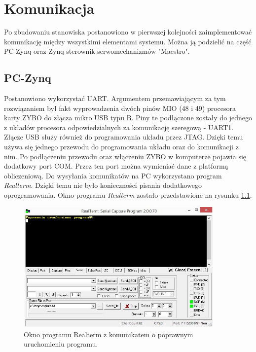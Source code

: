 \chapter{Komunikacja}
\label{cha:komunikacja}

Po zbudowaniu stanowiska postanowiono w pierwszej kolejności zaimplementować komunikację między wszystkimi elementami systemu. 
Można ją podzielić na część PC-Zynq oraz Zynq-sterownik serwomechanizmów "Maestro".

\section{PC-Zynq}
\label{sec:pc-zynq}
Postanowiono wykorzystać UART. 
Argumentem przemawiającym za tym rozwiązaniem był fakt wyprowadzenia dwóch pinów MIO (48 i 49) procesora karty ZYBO do złącza mikro USB typu B. 
Piny te podłączone zostały do jednego z układów procesora odpowiedzialnych za komunikację szeregową - UART1. 
Złącze USB służy również do programowania układu przez JTAG.
Dzięki temu używa się jednego przewodu do programowania układu oraz do komunikacji z nim. 
Po podłączeniu przewodu oraz włączeniu ZYBO w komputerze pojawia się dodatkowy port COM. 
Przez ten port można wymieniać dane z platformą obliczeniową. Do wysyłania komunikatów na PC wykorzystano program \textit{Realterm}. 
Dzięki temu nie było konieczności pisania dodatkowego oprogramowania. Okno programu \textit{Realterm} zostało przedstawione na rysunku \ref{fig:realterm}.

\begin{figure}[h]
	\centering
	\includegraphics[width=4in]{realterm.jpg}
	\caption{Okno programu Realterm z komunikatem o poprawnym uruchomieniu programu.}
	\label{fig:realterm}
\end{figure}


